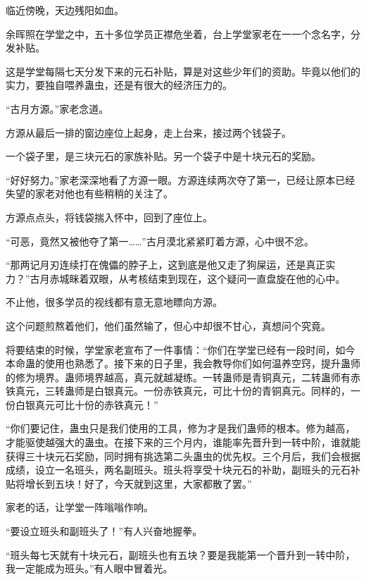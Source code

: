 
\begin{this_body}

临近傍晚，天边残阳如血。

余晖照在学堂之中，五十多位学员正襟危坐着，台上学堂家老在一一个念名字，分发补贴。

这是学堂每隔七天分发下来的元石补贴，算是对这些少年们的资助。毕竟以他们的实力，要独自喂养蛊虫，还是有很大的经济压力的。

“古月方源。”家老念道。

方源从最后一排的窗边座位上起身，走上台来，接过两个钱袋子。

一个袋子里，是三块元石的家族补贴。另一个袋子中是十块元石的奖励。

“好好努力。”家老深深地看了方源一眼。方源连续两次夺了第一，已经让原本已经失望的家老对他也有些稍稍的关注了。

方源点点头，将钱袋揣入怀中，回到了座位上。

“可恶，竟然又被他夺了第一……”古月漠北紧紧盯着方源，心中很不忿。

“那两记月刃连续打在傀儡的脖子上，这到底是他又走了狗屎运，还是真正实力？”古月赤城眯着双眼，从考核结束到现在，这个疑问一直盘旋在他的心中。

不止他，很多学员的视线都有意无意地瞟向方源。

这个问题煎熬着他们，他们虽然输了，但心中却很不甘心，真想问个究竟。

将要结束的时候，学堂家老宣布了一件事情：“你们在学堂已经有一段时间，如今本命蛊的使用也熟悉了。接下来的日子里，我会教导你们如何温养空窍，提升蛊师的修为境界。蛊师境界越高，真元就越凝练。一转蛊师是青铜真元，二转蛊师有赤铁真元，三转蛊师是白银真元。一份赤铁真元，可比十份的青铜真元。同样的，一份白银真元可比十份的赤铁真元！”

“你们要记住，蛊虫只是我们使用的工具，修为才是我们蛊师的根本。修为越高，才能驱使越强大的蛊虫。在接下来的三个月内，谁能率先晋升到一转中阶，谁就能获得三十块元石奖励，同时拥有挑选第二头蛊虫的优先权。三个月后，我们会根据成绩，设立一名班头，两名副班头。班头将享受十块元石的补助，副班头的元石补贴将增长到五块！好了，今天就到这里，大家都散了罢。”

家老的话，让学堂一阵嗡嗡作响。

“要设立班头和副班头了！”有人兴奋地握拳。

“班头每七天就有十块元石，副班头也有五块？要是我能第一个晋升到一转中阶，我一定能成为班头。”有人眼中冒着光。


\end{this_body}
